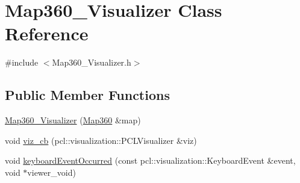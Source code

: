 \hypertarget{classMap360__Visualizer}{\section{Map360\-\_\-\-Visualizer Class Reference}
\label{classMap360__Visualizer}
}


{\ttfamily \#include $<$Map360\-\_\-\-Visualizer.\-h$>$}

\subsection*{Public Member Functions}
\begin{DoxyCompactItemize}
\item 
\hyperlink{classMap360__Visualizer_a9333eaa720305c2f04f8d49159eb1411}{Map360\-\_\-\-Visualizer} (\hyperlink{structMap360}{Map360} \&map)
\item 
void \hyperlink{classMap360__Visualizer_a8722dafc3a3cccfe73f02eb6f1877c2d}{viz\-\_\-cb} (pcl\-::visualization\-::\-P\-C\-L\-Visualizer \&viz)
\item 
void \hyperlink{classMap360__Visualizer_a8b1d4828e9f91c89d95074b7f36a7127}{keyboard\-Event\-Occurred} (const pcl\-::visualization\-::\-Keyboard\-Event \&event, void $\ast$viewer\-\_\-void)
\end{DoxyCompactItemize}
